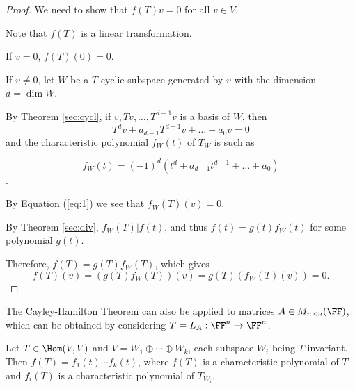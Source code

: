 \documentclass[11pt]{scrartcl}
\begin{document}
  \begin{proof}
    We need to show that $f(T)v = 0$ for all $v\in V$.

    Note that  $f(T)$ is a linear transformation.

    If $v = 0$, $f(T)(0) = 0$.

    If $v \neq 0$, let $W$ be a $T$-cyclic subspace generated by $v$
    with the dimension $d = \dim W$.

    By Theorem \ref{sec:cycl}, if $v, Tv, \dots, T^{d-1}v$ is a basis
    of $W$, then 
    \begin{equation}
      \label{eq:1}
      T^{d}v + a_{d-1}T^{d-1}v + \dots +a_{0}v = 0
    \end{equation}
    and the characteristic polynomial $f_W(t)$ of $T_W$ is such as
    
    \begin{equation*}
      f_W(t) = (-1)^{d}(t^{d}+a_{d-1}t^{d-1} + \dots + a_{0})
    \end{equation*}.

    By Equation (\ref{eq:1}) we see that $f_{W}(T)(v) = 0$.

    By Theorem \ref{sec:div}, $f_{W}(T) | f(t)$, and thus $f(t) = g(t) f_{W}(t)$
    for some polynomial $g(t)$.

    Therefore, $f(T) = g(T)f_{W}(T)$, which gives
    \[f(T)(v) = (g(T)f_{W}(T))(v) = g(T)(f_{W}(T)(v)) = 0.\]
  \end{proof}
  \begin{remark}
    The Cayley-Hamilton Theorem can also be applied to matrices
    $A \in M_{n\times n}(\FF)$, which can be obtained by considering
    $T = L_{A}: \FF^n\to \FF^{n}$.
  \end{remark}
  \begin{theorem}
    Let $T\in \Hom(V, V)$ and $V = W_1\oplus \cdots \oplus W_{k}$,
    each subspace $W_{i}$ being $T$-invariant.  Then
    $f(T) = f_1(t) \cdots f_k(t)$, where $f(T)$ is a characteristic
    polynomial of $T$ and $f_i(T)$ is a characteristic polynomial of $T_{W_{i}}$.
  \end{theorem}
\end{document}
